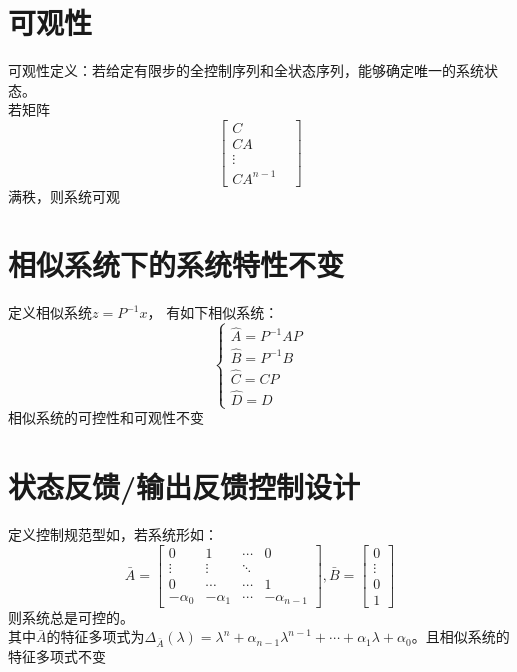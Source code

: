 \section{可观性}
\begin{theorembox}
	可观性定义：若给定有限步的全控制序列和全状态序列，能够确定唯一的系统状态。\\
	若矩阵
	\begin{equation*}
		\begin{bmatrix}
		C &\\
		CA &\\
		\vdots &\\
		CA^{n-1} &
		\end{bmatrix}
	\end{equation*}
	满秩，则系统可观
\end{theorembox}
\section{相似系统下的系统特性不变}
\begin{theorembox}
	定义相似系统$z = P^{-1}x$， 有如下相似系统：
	\begin{equation*}
  \begin{cases}
  	\hat{A} = P^{-1}AP \\
  	\hat{B} = P^{-1}B \\
  	\hat{C} = CP \\
  	\hat{D} = D
  \end{cases}
\end{equation*}
相似系统的可控性和可观性不变
\end{theorembox}
\section{状态反馈/输出反馈控制设计}
\begin{theorembox}
	定义控制规范型如，若系统形如：
	\begin{equation*}
	\bar{A} = 
  \begin{bmatrix}
 0 & 1& \cdots & 0 \\
 \vdots & \vdots & \ddots & \\
 0 & \cdots & \cdots & 1 \\
 -\alpha_0 &-\alpha_1 & \cdots & -\alpha_{n-1}
\end{bmatrix}, \bar{B} = \begin{bmatrix}
	0 \\ \vdots \\ 0 \\ 1
\end{bmatrix}
\end{equation*}
则系统总是可控的。\\
其中$\bar{A}$的特征多项式为$\Delta_{\bar{A}}(\lambda)=\lambda ^n + \alpha_{n-1}\lambda^{n-1} + \cdots + \alpha_1 \lambda + \alpha_0$。且相似系统的特征多项式不变\\
\end{theorembox}
